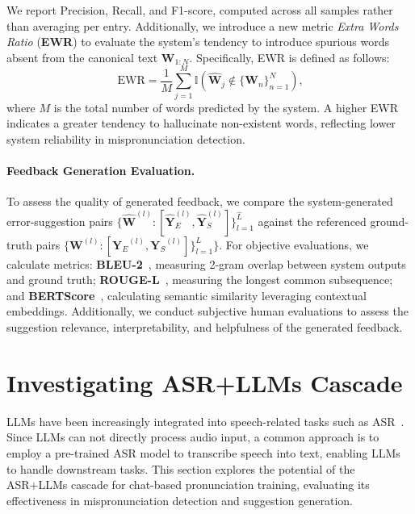 \documentclass[11pt]{article}
\begin{document}
We report Precision, Recall, and F1-score, computed across all samples rather than averaging per entry. Additionally, we introduce a new metric \textit{Extra Words Ratio} (\textbf{EWR}) to evaluate the system’s tendency to introduce spurious words absent from the canonical text $\boldsymbol{W}_{1:N}$. Specifically, EWR is defined as follows:
\begin{equation}
     \mathrm{EWR} = \frac{1}{M}\sum_{j=1}^{M} \mathbb{I}(\hat{\boldsymbol{W}}_j \notin \{\boldsymbol{W}_n\}^N_{n=1})\textrm{,}
\end{equation}
where $M$ is the total number of words predicted by the system. A higher EWR indicates a greater tendency to hallucinate non-existent words, reflecting lower system reliability in mispronunciation detection.

\paragraph{Feedback Generation Evaluation.}

To assess the quality of generated feedback, we compare the system-generated error-suggestion pairs $\{\hat{\boldsymbol{W}}^{(l)}\colon[\hat{\boldsymbol{Y}}_E^{(l)}\textrm{,}\,\hat{\boldsymbol{Y}}_S^{(l)}]\}_{l=1}^{\hat{L}}$ against the referenced ground-truth pairs $\{\boldsymbol{W}^{(l)}\colon[{\boldsymbol{Y}_E}^{(l)}, {\boldsymbol{Y}_S}^{(l)}]\}^L_{l=1}\}$. For objective evaluations, we calculate metrics: \textbf{BLEU-2}~\cite{papineni2002bleu}, measuring 2-gram overlap between system outputs and ground truth; \textbf{ROUGE-L}~\citep{lin2004rouge}, measuring the longest common subsequence; and \textbf{BERTScore}~\citep{zhang2019bertscore}, calculating semantic similarity leveraging contextual embeddings. Additionally, we conduct subjective human evaluations to assess the suggestion relevance, interpretability, and helpfulness of the generated feedback.


\section{Investigating ASR+LLMs Cascade}
\label{sec:asr+llm}



LLMs have been increasingly integrated into speech-related tasks such as ASR~\citep{Ma2024AnES, 10800077}. Since LLMs can not directly process audio input, a common approach is to employ a pre-trained ASR model to transcribe speech into text, enabling LLMs to handle downstream tasks. This section explores the potential of the ASR+LLMs cascade for chat-based pronunciation training, evaluating its effectiveness in mispronunciation detection and suggestion generation.  
\end{document}
